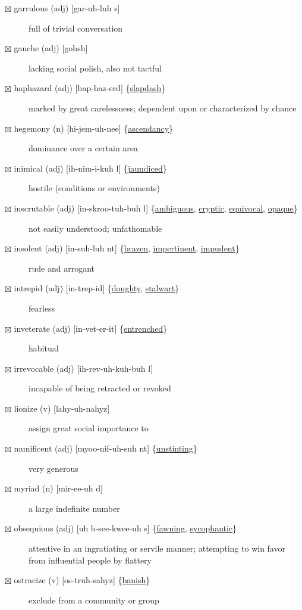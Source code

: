 \documentclass[11pt]{article}
\begin{document}
\begin{description}
\item[{$\boxtimes$ \label{org38a0b5f}garrulous (adj) [gar-uh-luh s]}] full of trivial conversation
\item[{$\boxtimes$ \label{org5824b06}gauche (adj) [gohsh]}] lacking social polish, also not tactful
\item[{$\boxtimes$ \label{org26e7d3a}haphazard (adj) [hap-haz-erd] \{\hyperref[orgbe36a91]{slapdash}\}}] marked by great carelessness; dependent upon or characterized by chance
\item[{$\boxtimes$ \label{org6f72524}hegemony (n) [hi-jem-uh-nee] \{\hyperref[org61dbb17]{ascendancy}\}}] dominance over a certain area
\item[{$\boxtimes$ \label{org91295a0}inimical (adj) [ih-nim-i-kuh l] \{\hyperref[org4928894]{jaundiced}\}}] hostile (conditions or environments)
\item[{$\boxtimes$ \label{org3d97e2d}inscrutable (adj) [in-skroo-tuh-buh l] \{\hyperref[orgc4611e5]{ambiguous}, \hyperref[org55b5c86]{cryptic}, \hyperref[orgd229018]{equivocal}, \hyperref[org26d66c4]{opaque}\}}] not easily understood; unfathomable
\item[{$\boxtimes$ \label{org7d4233d}insolent (adj) [in-suh-luh nt] \{\hyperref[orga7c2142]{brazen}, \hyperref[org66b257e]{impertinent}, \hyperref[orgdac3101]{impudent}\}}] rude and arrogant
\item[{$\boxtimes$ \label{orgbe34286}intrepid (adj) [in-trep-id] \{\hyperref[org9ada76e]{doughty}, \hyperref[org164f71e]{stalwart}\}}] fearless
\item[{$\boxtimes$ \label{org4a1704d}inveterate (adj) [in-vet-er-it] \{\hyperref[orgcd381ea]{entrenched}\}}] habitual
\item[{$\boxtimes$ irrevocable (adj) [ih-rev-uh-kuh-buh l]}] incapable of being retracted or revoked
\item[{$\boxtimes$ lionize (v) [lahy-uh-nahyz]}] assign great social importance to
\item[{$\boxtimes$ \label{org036e9f8} \label{org151f55a}munificent (adj) [myoo-nif-uh-suh nt] \{\hyperref[org2c60d44]{unstinting}\}}] very generous
\item[{$\boxtimes$ myriad (n) [mir-ee-uh d]}] a large indefinite number
\item[{$\boxtimes$ obsequious (adj) [uh b-see-kwee-uh s] \{\hyperref[orgd171442]{fawning}, \hyperref[orgd5a859e]{sycophantic}\}}] attentive in an ingratiating or servile manner; attempting to win favor from influential people by flattery
\item[{$\boxtimes$ \label{org7a04a9a}ostracize (v) [os-truh-sahyz] \{\hyperref[orgd3acd25]{banish}\}}] exclude from a community or group

\end{description}
\end{document}
